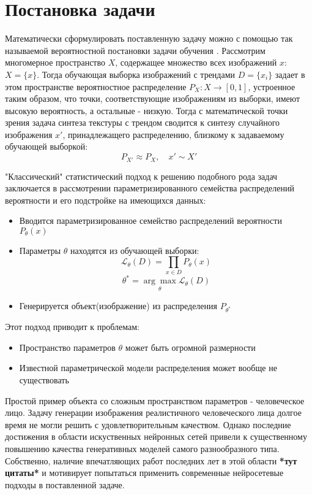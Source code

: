 \section{Постановка задачи}
	Математически сформулировать поставленную задачу можно с помощью так называемой вероятностной постановки задачи обучения \cite{Voron-ML, GAN}.
	Рассмотрим многомерное пространство $X$, содержащее множество всех изображений $x$: $X = \{x\}$. Тогда обучающая выборка изображений с трендами $D = \{x_i\}$ задает в этом пространстве вероятностное распределение $P_X : X \longrightarrow [0,1]$, устроенное таким образом, что точки, соответствующие изображениям из выборки, имеют высокую вероятность, а остальные - низкую. Тогда с математической точки зрения задача синтеза текстуры с трендом сводится к синтезу случайного изображения $x'$, принадлежащего распределению, близкому к задаваемому обучающей выборкой:
	$$ P_{X'} \approx P_X, \quad x' \sim X'$$
	
	"Классический" статистический подход к решению подобного рода задач заключается в рассмотрении параметризированного семейства распределений вероятности и его подстройке на имеющихся данных:
	\begin{itemize}
		\item Вводится параметризированное семейство распределений вероятности $P_{\theta}(x)$
		\item Параметры $\theta$ находятся из обучающей выборки:
		$$ \mathcal{L}_{\theta}(D) = \prod_{x \in D} P_{\theta}(x) $$
		$$ \theta^{*} = \underset{\theta}{\arg\max} \mathcal{L}_{\theta}(D)$$
		\item Генерируется объект(изображение) из распределения $ P_{\theta^{*}}$
	\end{itemize}
	Этот подход приводит к проблемам:
	\begin{itemize}
		\item Пространство параметров $\theta$ может быть огромной размерности
		\item Известной параметрической модели распределения может вообще не существовать
	\end{itemize}
	Простой пример объекта со сложным пространством параметров - человеческое лицо. Задачу генерации изображения реалистичного человеческого лица долгое время не могли решить с удовлетворительным качеством. Однако последние достижения в области искуственных нейронных сетей привели к существенному повышению качества генеративных моделей самого разнообразного типа. Собственно, наличие впечатляющих работ последних лет в этой области \textbf{*тут цитаты*} и мотивирует попытаться применить современные нейросетевые подходы в поставленной задаче.
